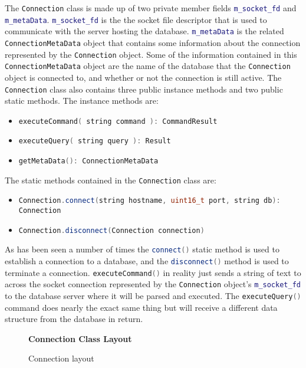 \documentclass[letterpaper, 12pt]{article}
\newcommand{\inlinecode}[1]{\colorbox{codegrey}{\lstinline[language=C++]{#1}}}
\begin{document}
  \par\vspace{\baselineskip}
  The \inlinecode{Connection} class is made up of two private
  member fields \inlinecode{m_socket_fd} and
  \inlinecode{m_metaData}.
  \inlinecode{m_socket_fd} is the the socket file descriptor that is
  used to communicate with the server hosting the database.
  \inlinecode{m_metaData} is the related
  \inlinecode{ConnectionMetaData} object that contains some
  information about the connection represented by the
  \inlinecode{Connection} object. Some of the information contained
  in this \inlinecode{ConnectionMetaData} object are
  the name of the database that the \inlinecode{Connection} object
  is connected to, and whether or not the connection is still active. The
  \inlinecode{Connection} class also contains three public
  instance methods and two public static methods. The instance methods are:
  \begin{itemize}
    \item \inlinecode{executeCommand( string command ): CommandResult}
    \item \inlinecode{executeQuery( string query ): Result}
    \item \inlinecode{getMetaData(): ConnectionMetaData}
  \end{itemize}
  The static methods contained in the \inlinecode{Connection} class
  are:
  \begin{itemize}
  	\item \inlinecode{Connection.connect(string hostname, uint16_t port, string db): Connection}
  	\item \inlinecode{Connection.disconnect(Connection connection)}
  \end{itemize}
  As has been seen a number of times the \inlinecode{connect()}
  static method is used  to establish a connection to a database, and the
  \inlinecode{disconnect()} method is used to terminate a connection.
  \inlinecode{executeCommand()} in reality just sends a string of
  text to across the socket connection represented by the
  \inlinecode{Connection} object's
  \inlinecode{m_socket_fd} to the database server where it will be
  parsed and executed. The \inlinecode{executeQuery()} command
  does nearly the exact same thing but will receive a different data structure from the
  database in return.

  \begin{figure}
    \centering
    \textbf{Connection Class Layout}
	\caption{Connection layout}
  \end{figure}
  \par\vspace{\baselineskip}
\end{document}
